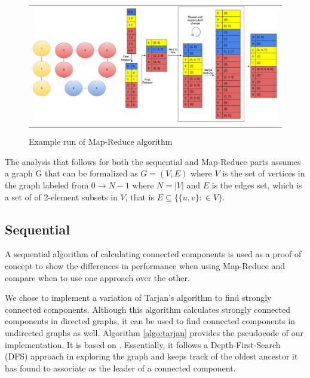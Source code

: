 \begin{figure}[!t]
\begin{tabular}{@{}c@{}}
 	\begin{minipage}{42pc}
 		\centering
 		\includegraphics[width=40pc]{figures/mapreduce_example.pdf}
 		\caption{Example run of Map-Reduce algorithm}
 		\label{figure:hiveVsShark}
	\end{minipage}
\end{tabular}
\end{figure}

The analysis that follows for both the sequential and Map-Reduce parts assumes a graph G that can be formalized as $G=(V,E)$ where $V$ is the set of vertices in the graph labeled from $0 \to N-1$ where $N=|V|$ and $E$ is the edges set, which is a set of of 2-element subsets in $V$, that is $E \subseteq \{\{u,v\}: \in V\}$.

\subsection{Sequential}
A sequential algorithm of calculating connected components is used as a proof of concept to show the differences in performance when using Map-Reduce and compare when to use one approach over the other.

We chose to implement a variation of Tarjan's algorithm to find strongly connected components. Although this algorithm calculates strongly connected components in directed graphs, it can be used to find connected components in undirected graphs as well. Algorithm \ref{algo:tarjan} provides the pseudocode of our implementation. It is based on \cite{tarjan}. Essentially, it follows a Depth-First-Search (DFS) approach in exploring the graph and keeps track of the oldest ancestor it has found to associate as the leader of a connected component.

